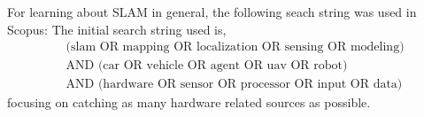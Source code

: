For learning about SLAM in general, the following seach string was used in
Scopus:
The initial search string used is,
\begin{align}
    &\text{(slam OR mapping OR localization OR sensing OR modeling)} \nonumber \\ 
    &\text{AND (car OR vehicle OR agent OR uav OR robot)} \\
    &\text{AND (hardware OR sensor OR processor OR input OR data)} \nonumber
\end{align}
focusing on catching as many hardware related sources as possible.  
